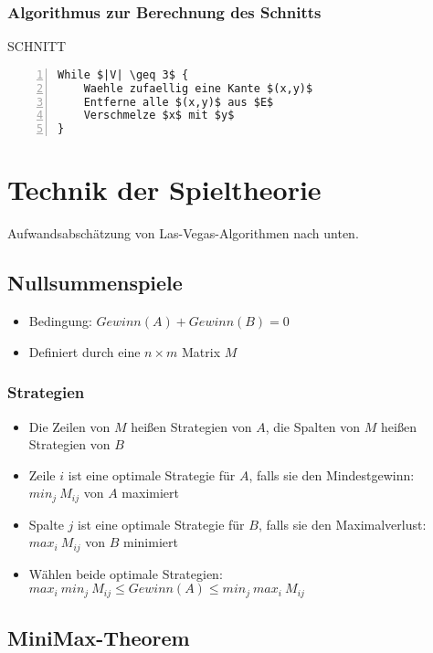 \subsubsection{Algorithmus zur Berechnung des Schnitts}
\begin{minipage}{\textwidth}
SCHNITT
\begin{lstlisting}[frame=single,numbers=left,mathescape]
While $|V| \geq 3$ {
	Waehle zufaellig eine Kante $(x,y)$
	Entferne alle $(x,y)$ aus $E$
	Verschmelze $x$ mit $y$
}
\end{lstlisting}
\end{minipage}



\section{Technik der Spieltheorie}
Aufwandsabschätzung von Las-Vegas-Algorithmen nach unten.

\subsection{Nullsummenspiele}
\begin{itemize}
	\item Bedingung: \(Gewinn(A) + Gewinn(B) = 0\)
	\item Definiert durch eine \(n \times m\) Matrix \(M\)
\end{itemize}

\subsubsection{Strategien}
\begin{itemize}
	\item Die Zeilen von \(M\) heißen Strategien von \(A\), die Spalten von \(M\) heißen Strategien von \(B\)
	\item Zeile \(i\) ist eine optimale Strategie für \(A\), falls sie den Mindestgewinn: \(min_j~M_{ij}\) von \(A\) maximiert
	\item Spalte \(j\) ist eine optimale Strategie für \(B\), falls sie den Maximalverlust: \(max_i~M_{ij}\) von \(B\) minimiert
	\item Wählen beide optimale Strategien: \(max_i~min_j~M_{ij} \leq Gewinn(A) \leq min_j~max_i~M_{ij}\)
\end{itemize}


\subsection{MiniMax-Theorem}


